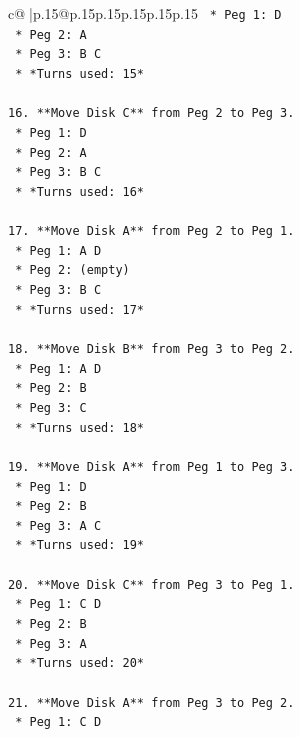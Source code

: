 \documentclass{article}
\begin{document}
{\begin{supertabular}{c@{$\;$}|p{.15\linewidth}@{}p{.15\linewidth}p{.15\linewidth}p{.15\linewidth}p{.15\linewidth}p{.15\linewidth}}
{{{\texttt{    *   Peg 1: D} \\
\texttt{    *   Peg 2: A} \\
\texttt{    *   Peg 3: B C} \\
\texttt{    *   *Turns used: 15*} \\
\\ 
\texttt{16. **Move Disk C** from Peg 2 to Peg 3.} \\
\texttt{    *   Peg 1: D} \\
\texttt{    *   Peg 2: A} \\
\texttt{    *   Peg 3: B C} \\
\texttt{    *   *Turns used: 16*} \\
\\ 
\texttt{17. **Move Disk A** from Peg 2 to Peg 1.} \\
\texttt{    *   Peg 1: A D} \\
\texttt{    *   Peg 2: (empty)} \\
\texttt{    *   Peg 3: B C} \\
\texttt{    *   *Turns used: 17*} \\
\\ 
\texttt{18. **Move Disk B** from Peg 3 to Peg 2.} \\
\texttt{    *   Peg 1: A D} \\
\texttt{    *   Peg 2: B} \\
\texttt{    *   Peg 3: C} \\
\texttt{    *   *Turns used: 18*} \\
\\ 
\texttt{19. **Move Disk A** from Peg 1 to Peg 3.} \\
\texttt{    *   Peg 1: D} \\
\texttt{    *   Peg 2: B} \\
\texttt{    *   Peg 3: A C} \\
\texttt{    *   *Turns used: 19*} \\
\\ 
\texttt{20. **Move Disk C** from Peg 3 to Peg 1.} \\
\texttt{    *   Peg 1: C D} \\
\texttt{    *   Peg 2: B} \\
\texttt{    *   Peg 3: A} \\
\texttt{    *   *Turns used: 20*} \\
\\ 
\texttt{21. **Move Disk A** from Peg 3 to Peg 2.} \\
\texttt{    *   Peg 1: C D} \\
}}}
\end{supertabular}}
\end{document}
